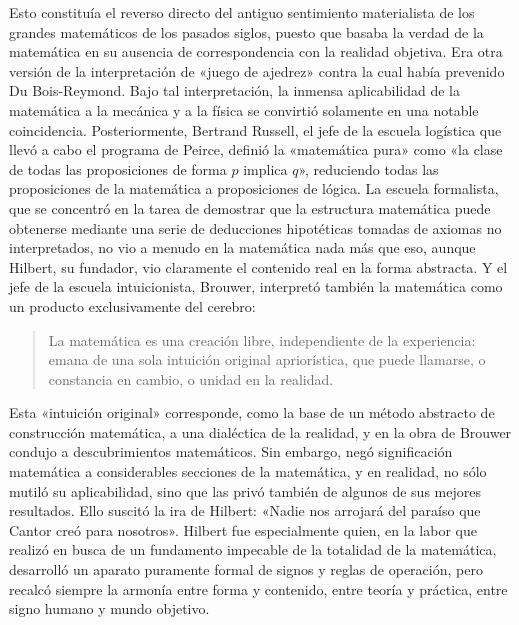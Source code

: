 \documentclass[a4paper, 12pt]{article}
\begin{document}
{{Esto constituía el reverso directo del antiguo sentimiento materialista de los
grandes matemáticos de los pasados siglos, puesto que basaba la verdad de la
matemática en su ausencia de correspondencia con la realidad objetiva. Era otra
versión de la interpretación de «juego de ajedrez» contra la cual había
prevenido Du Bois-Reymond. Bajo tal interpretación, la inmensa aplicabilidad de
la matemática a la mecánica y a la física se convirtió solamente en una notable
coincidencia. Posteriormente, Bertrand Russell, el jefe de la escuela logística
que llevó a cabo el programa de Peirce, definió la «matemática pura»  como «la
clase de todas las proposiciones de forma $p$ implica $q$», reduciendo todas las
proposiciones de la matemática a proposiciones de lógica. La escuela formalista,
que se concentró en la tarea de demostrar que la estructura matemática puede
obtenerse mediante una serie de deducciones hipotéticas tomadas de axiomas no
interpretados, no vio a menudo en la matemática nada más que eso, aunque
Hilbert, su fundador, vio claramente el contenido real en la forma abstracta. Y
el jefe de la escuela intuicionista, Brouwer, interpretó también la matemática
como un producto exclusivamente del cerebro:

\begin{quote}\small La matemática es una creación libre, independiente de la
experiencia: emana de una sola intuición original apriorística, que puede
llamarse, o constancia en cambio, o unidad en la realidad. \end{quote}

Esta «intuición original» corresponde, como la base de un método abstracto de
construcción matemática, a una dialéctica de la realidad, y en la obra de
Brouwer condujo a descubrimientos matemáticos. Sin embargo, negó significación
matemática a considerables secciones de la matemática, y en realidad, no sólo
mutiló su aplicabilidad, sino que las privó también de algunos de sus mejores
resultados. Ello suscitó la ira de Hilbert: «Nadie nos arrojará del paraíso que
Cantor creó para nosotros». Hilbert fue especialmente quien, en la labor que
realizó en busca de un fundamento impecable de la totalidad de la matemática,
desarrolló un aparato puramente formal de signos y reglas de operación, pero
recalcó siempre la armonía entre forma y contenido, entre teoría y práctica,
entre signo humano y mundo objetivo.

}}
\end{document}
